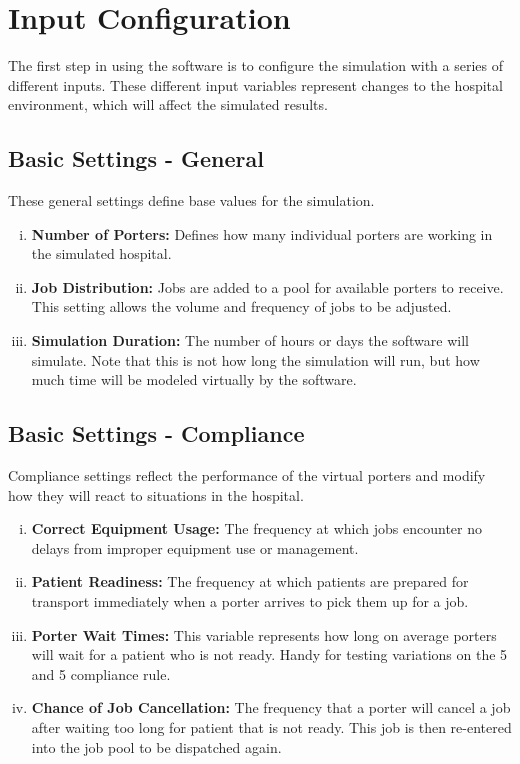 \documentclass[paper=letter, fontsize=10pt]{scrartcl}
\numberwithin{equation}{section}		%
\numberwithin{figure}{section}			%
\numberwithin{table}{section}				%
\begin{document}
\section{Input Configuration}
The first step in using the software is to configure the simulation with a series of different inputs. These different input variables represent changes to the hospital environment, which will affect the simulated results. 
	\subsection{Basic Settings - General}
	These general settings define base values for the simulation.
	\begin{enumerate}[(i)]
		\item \textbf{Number of Porters:} Defines how many individual porters are working in the simulated hospital.
		\item \textbf{Job Distribution:} Jobs are added to a pool for available porters to receive. This setting allows the volume and frequency of jobs to be adjusted.
		\item \textbf{Simulation Duration:} The number of hours or days the software will simulate. Note that this is not how long the simulation will run, but how much time will be modeled virtually by the software. 
	\end{enumerate}
	
	\subsection{Basic Settings - Compliance}
	Compliance settings reflect the performance of the virtual porters and modify how they will react to situations in the hospital.
	\begin{enumerate}[(i)]
		\item \textbf{Correct Equipment Usage:} The frequency at which jobs encounter no delays from improper equipment use or management.
		\item \textbf{Patient Readiness:} The frequency at which patients are prepared for transport immediately when a porter arrives to pick them up for a job.
		\item \textbf{Porter Wait Times:} This variable represents how long on average porters will wait for a patient who is not ready. Handy for testing variations on the 5 and 5 compliance rule.
		\item \textbf{Chance of Job Cancellation:} The frequency that a porter will cancel a job after waiting too long for patient that is not ready. This job is then re-entered into the job pool to be dispatched again.
	\end{enumerate}
	
\end{document}
